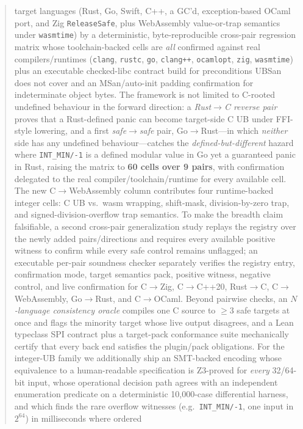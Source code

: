 \documentclass[10pt,a4paper]{article}
\begin{document}
\begin{abstract}
target languages (Rust, Go, Swift, C++, a GC'd, exception-based OCaml port, and
Zig \texttt{ReleaseSafe}, plus WebAssembly value-or-trap semantics under
\texttt{wasmtime})
by a deterministic, byte-reproducible
cross-pair regression matrix whose toolchain-backed cells are \emph{all}
confirmed against real compilers/runtimes (\texttt{clang}, \texttt{rustc}, \texttt{go},
\texttt{clang++}, \texttt{ocamlopt}, \texttt{zig}, \texttt{wasmtime}) plus an executable checked-libc contract
build for preconditions UBSan does not cover and an MSan/auto-init padding
confirmation for indeterminate object bytes. The framework is not limited to
\mbox{C-rooted} undefined behaviour in the forward direction: a
\emph{Rust$\to$C reverse pair} proves that a Rust-defined panic can become
target-side C UB under FFI-style lowering, and a first \emph{safe$\to$safe} pair,
Go$\to$Rust---in which \emph{neither} side has any undefined behaviour---catches
the \emph{defined-but-different} hazard where \texttt{INT\_MIN/-1} is a defined
modular value in Go yet a guaranteed panic in Rust, raising the matrix to
\textbf{60 cells over 9 pairs}, with confirmation delegated to the real
compiler/toolchain/runtime for every available cell. The new C$\to$WebAssembly
column contributes four runtime-backed integer cells: C UB vs.\ wasm wrapping,
shift-mask, division-by-zero trap, and signed-division-overflow trap semantics.
To make the breadth claim falsifiable, a second cross-pair generalization study
replays the registry over the newly added pairs/directions and requires every
available positive witness to confirm while every safe control remains unflagged;
an executable per-pair soundness checker separately verifies the registry entry,
confirmation mode, target semantics pack, positive witness, negative control, and
live confirmation for C$\to$Zig, C$\to$C++20, Rust$\to$C, C$\to$WebAssembly,
Go$\to$Rust, and C$\to$OCaml.
Beyond pairwise checks, an
\emph{$N$-language consistency oracle} compiles one C source to $\geq 3$ safe
targets at once and flags the minority target whose live output disagrees, and a
Lean typeclass SPI contract plus a target-pack conformance suite mechanically
certify that every back end satisfies the plugin/pack obligations. For the
integer-UB family we additionally ship an
SMT-backed encoding whose equivalence to a human-readable specification is
Z3-proved for \emph{every} 32/64-bit input, whose operational decision path
agrees with an independent enumeration predicate on a deterministic 10{,}000-case
differential harness, and which finds the rare overflow witnesses
(e.g.\ \texttt{INT\_MIN/-1}, one input in $2^{64}$) in milliseconds where ordered

\end{abstract}
\end{document}

